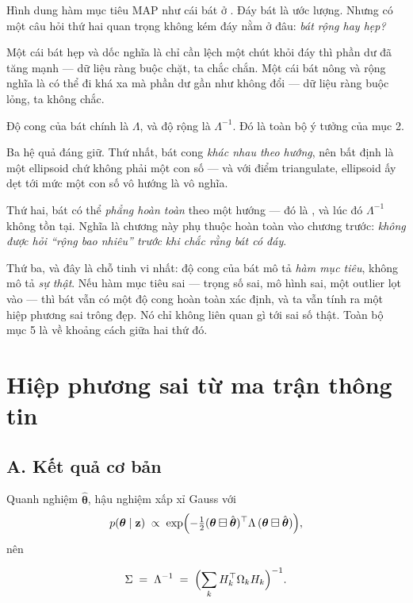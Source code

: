 \documentclass[../../vslam.tex]{subfiles}
\begin{document}
\begin{trucgiac}
Hình dung hàm mục tiêu MAP như cái bát ở . Đáy bát là ước lượng. Nhưng có một câu hỏi thứ hai quan trọng không kém đáy nằm ở đâu: \emph{bát rộng hay hẹp?}

Một cái bát hẹp và dốc nghĩa là chỉ cần lệch một chút khỏi đáy thì phần dư đã tăng mạnh --- dữ liệu ràng buộc chặt, ta chắc chắn. Một cái bát nông và rộng nghĩa là có thể đi khá xa mà phần dư gần như không đổi --- dữ liệu ràng buộc lỏng, ta không chắc.

Độ cong của bát chính là \(\Lambda\), và độ rộng là \(\Lambda^{-1}\). Đó là toàn bộ ý tưởng của mục 2.

Ba hệ quả đáng giữ. Thứ nhất, bát cong \emph{khác nhau theo hướng}, nên bất định là một ellipsoid chứ không phải một con số --- và với điểm triangulate, ellipsoid ấy dẹt tới mức một con số vô hướng là vô nghĩa.

Thứ hai, bát có thể \emph{phẳng hoàn toàn} theo một hướng --- đó là , và lúc đó \(\Lambda^{-1}\) không tồn tại. Nghĩa là chương này phụ thuộc hoàn toàn vào chương trước: \emph{không được hỏi ``rộng bao nhiêu'' trước khi chắc rằng bát có đáy}.

Thứ ba, và đây là chỗ tinh vi nhất: độ cong của bát mô tả \emph{hàm mục tiêu}, không mô tả \emph{sự thật}. Nếu hàm mục tiêu sai --- trọng số sai, mô hình sai, một outlier lọt vào --- thì bát vẫn có một độ cong hoàn toàn xác định, và ta vẫn tính ra một hiệp phương sai trông đẹp. Nó chỉ không liên quan gì tới sai số thật. Toàn bộ mục 5 là về khoảng cách giữa hai thứ đó.
\end{trucgiac}

\section{Hiệp phương sai từ ma trận thông tin}

\subsection{A. Kết quả cơ bản}

Quanh nghiệm \(\hat{\boldsymbol{\theta}}\), hậu nghiệm xấp xỉ Gauss với
\[
p(\boldsymbol{\theta}\mid\mathbf{z}) \;\propto\; \exp\Bigl(-\tfrac12(\boldsymbol{\theta}\boxminus\hat{\boldsymbol{\theta}})^{\top}\Lambda\,(\boldsymbol{\theta}\boxminus\hat{\boldsymbol{\theta}})\Bigr),
\]
nên

\begin{equation}
\Sigma \;=\; \Lambda^{-1} \;=\; \Bigl(\sum_k H_k^{\top}\Omega_k H_k\Bigr)^{-1} .
\label{eq:a06-sigma}
\end{equation}
\end{document}
